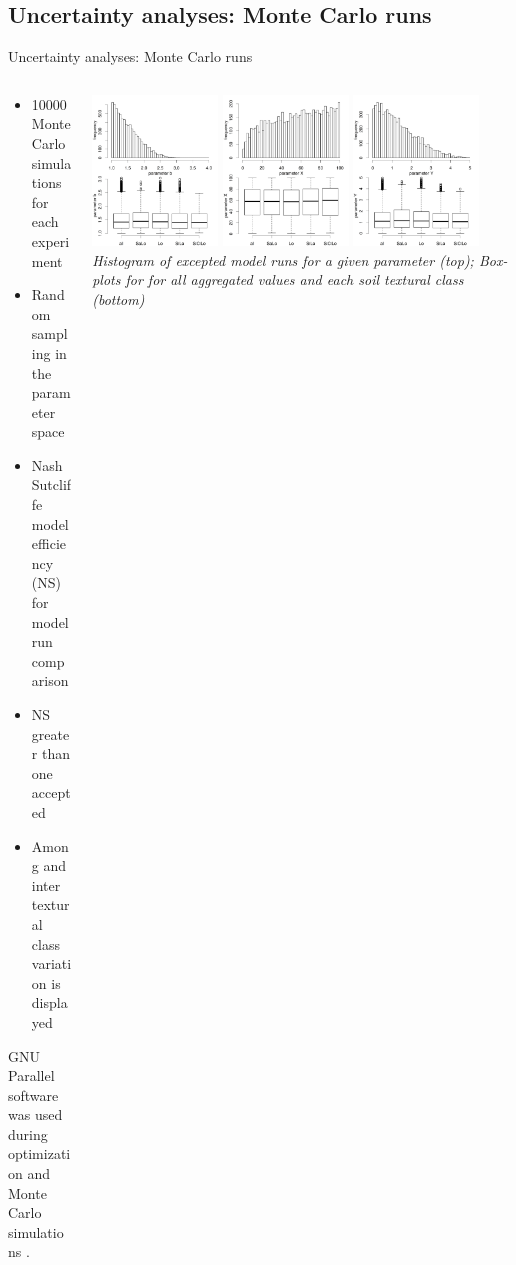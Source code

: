 \subsection{Uncertainty analyses: Monte Carlo runs}
\begin{block}{Uncertainty analyses: Monte Carlo runs}
\begin{columns}
    \begin{column}{0.25\textwidth}
        \begin{itemize}
            \item 10000 Monte Carlo simulations for each experiment
            \item Random sampling in the parameter space
            \item Nash Sutcliffe model efficiency (NS) for model run comparison
            \item NS greater than one accepted
            \item Among and inter textural class variation is displayed
        \end{itemize}
        GNU Parallel software was used during optimization and Monte Carlo simulations \citep{Tange2011a}. 
        \end{column}
        \begin{column}{0.75\textwidth}
            \includegraphics[width = 0.3\textwidth]{obr/mc_b.png}
            \includegraphics[width = 0.3\textwidth]{obr/mc_x.png}
            \includegraphics[width = 0.3\textwidth]{obr/mc_y.png}
            {\it  Histogram of excepted model runs for a given parameter (top); Box-plots for for all aggregated values and each soil textural class (bottom)}
        \end{column}
    \end{columns}
\end{block}















